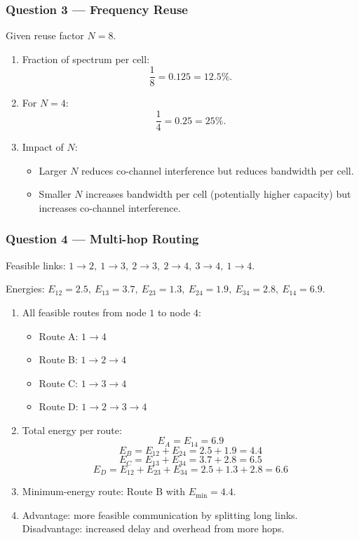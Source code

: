 \documentclass[11pt,a4paper]{article}
\begin{document}
\subsubsection*{Question 3 --- Frequency Reuse}
Given reuse factor $N=8$.

\begin{enumerate}[label=\alph*.]
    \item Fraction of spectrum per cell:
    \[
    \frac{1}{8}=0.125=12.5\%.
    \]
    \item For $N=4$:
    \[
    \frac{1}{4}=0.25=25\%.
    \]
    \item Impact of $N$:
    \begin{itemize}
        \item Larger $N$ reduces co-channel interference but reduces bandwidth per cell.
        \item Smaller $N$ increases bandwidth per cell (potentially higher capacity) but increases co-channel interference.
    \end{itemize}
    
\end{enumerate}

\subsubsection*{Question 4 --- Multi-hop Routing}
Feasible links: $1\to 2,\ 1\to 3,\ 2\to 3,\ 2\to 4,\ 3\to 4,\ 1\to 4$.

Energies: $E_{12}=2.5,\ E_{13}=3.7,\ E_{23}=1.3,\ E_{24}=1.9,\ E_{34}=2.8,\ E_{14}=6.9$.

\begin{enumerate}[label=\alph*.]
    \item All feasible routes from node $1$ to node $4$:
    \begin{itemize}
        \item Route A: $1\to 4$
        \item Route B: $1\to 2\to 4$
        \item Route C: $1\to 3\to 4$
        \item Route D: $1\to 2\to 3\to 4$
    \end{itemize}
    \item Total energy per route:
    \[
    E_A=E_{14}=6.9
    \]
    \[
    E_B=E_{12}+E_{24}=2.5+1.9=4.4
    \]
    \[
    E_C=E_{13}+E_{34}=3.7+2.8=6.5
    \]
    \[
    E_D=E_{12}+E_{23}+E_{34}=2.5+1.3+2.8=6.6
    \]
    \item Minimum-energy route: Route B with $E_{\min}=4.4$.
    \item Advantage: more feasible communication by splitting long links. Disadvantage: increased delay and overhead from more hops.
\end{enumerate}
\end{document}

